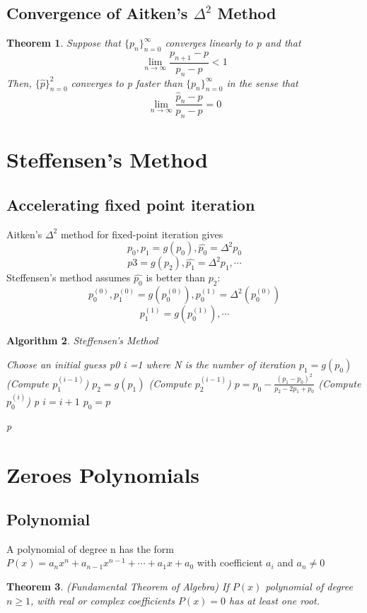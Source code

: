 \documentclass[12pt]{article}
\newtheorem{theorem}{Theorem}[subsection]
\newtheorem{alg}[theorem]{Algorithm}
\begin{document}
\subsection{Convergence of Aitken's $\Delta^2$ Method}
\begin{theorem}
Suppose that $\{p_n\}_{n=0}^{\infty}$ converges linearly to p and that $$\lim_{n \to \infty} \frac{p_{n+1} - p}{p_n - p} <1$$
Then,  	$\{\hat{p}\}_{n=0}^2$ converges to p faster than $\{p_n\}_{n=0}^{\infty}$ in the sense that 
$$\lim_{n \to \infty}\frac{\hat{p}_n -p}{p_n - p} = 0$$
\end{theorem}


\section{Steffensen's Method}
\subsection{Accelerating fixed point iteration}
Aitken's $\Delta^2$ method for fixed-point iteration gives $$p_0, p_1 = g(p_0), \hat{p_0} = \Delta^2p_0$$ $$p3 = g(p_2), \hat{p_1} = \Delta^2p_1, \cdots$$
Steffensen's method assumes $\hat{p_0}$ is better than $p_2$: 
$$p_0^{(0)}, p_1^{(0)} = g(p_0^{(0)}), p_0^{(1)} = \Delta^2(p_0^{(0)})$$ $$p_1^{(1)} = g(p_0^{(1)}), \cdots$$
\begin{alg}{Steffensen's Method}
	\begin{algorithmic}
	Choose an initial guess p0
	\State i =1
	 where N is the number of iteration
		\State $p_1 = g(p_0)$ (Compute $p_1^{(i-1)}$)
		\State $p_2 = g(p_1)$ (Compute $p_2^{(i-1)}$)
		\State $p = p_0 - \frac{(p_1 - p_0)^2}{p_2 - 2p_1 + p_0}$ (Compute $p_0^{(i)}$)
			\State \Return p
		\EndIf
		\State $i = i+1$
		\State $p_0 = p$
		
	\EndWhile
	\State \Return p	
	\end{algorithmic}

\end{alg}


\section{Zeroes Polynomials}

\subsection{Polynomial}
A polynomial of degree n has the form $P(x) = a_nx^n +a_{n-1}x^{n-1} + \cdots +a_1x + a_0$ with coefficient $a_i$ and $a_n \neq 0$
\begin{theorem}{(Fundamental Theorem of Algebra)}
\newline If $P(x)$ polynomial of degree $n \geq 1$, with real or complex coefficients $P(x) = 0$ has at least one root. 	
\end{theorem} 
\end{document}
